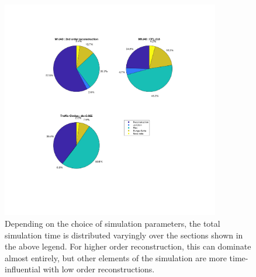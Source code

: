 	\begin{figure}
    		\centering
        		\includegraphics[trim=160 170 160 130,clip,width=0.85\textwidth]{Time_mixed.pdf}
		\caption[Time Analysis : Total time breakdown]{Depending on the choice of simulation parameters, the total simulation time is distributed varyingly over the sections shown in the above legend. For higher order reconstruction, this can dominate almost entirely, but other elements of the simulation are more time-influential with low order reconstructions.}
		\label{fig:randd:Time:mixed}
	\end{figure}
	
	
	
	
	
	
	